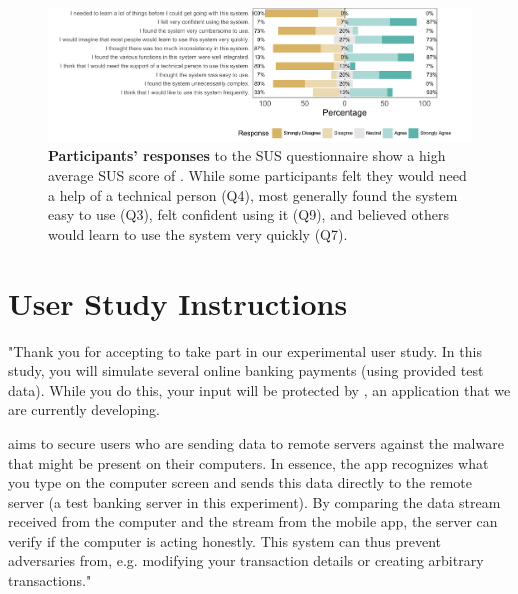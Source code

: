 \begin{figure}[tp]
	\centering
	\includegraphics[trim={0.6cm 0 0 0.5cm},width=1.05\linewidth]{img/SUSAnalysis2.pdf}
	\caption{
		\textbf{Participants' responses} to the SUS questionnaire show a high average SUS score of .
		While some participants felt they would need a help of a technical person (Q4), most generally found the system easy to use (Q3), felt confident using it (Q9), and believed others would learn to use the system very quickly (Q7).
	} \label{fig:SUSResults}
	\vspace{1cm}
\end{figure}


\section{User Study Instructions} \label{app:userInstructions}

{\sf
"Thank you for accepting to take part in our experimental user study.
In this study, you will simulate several online banking payments (using provided test data).
While you do this, your input will be protected by \sysname, an application that we are currently developing.

\sysname aims to secure users who are sending data to remote servers against the malware that might be present on their computers.
In essence, the app recognizes what you type on the computer screen and sends this data directly to the remote server (a test banking server in this experiment).
By comparing the data stream received from the computer and the stream from the mobile app, the server can verify if the computer is acting honestly.
This system can thus prevent adversaries from, e.g. modifying your transaction details or creating arbitrary transactions."
}





